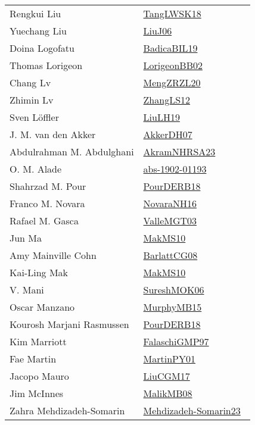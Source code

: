 {\begin{longtable}{p{4cm}p{20cm}}
Rengkui Liu & \href{}{TangLWSK18}~\cite{TangLWSK18}\\
Yuechang Liu & \href{works/LiuJ06.pdf}{LiuJ06}~\cite{LiuJ06}\\
Doina Logofatu & \href{works/BadicaBIL19.pdf}{BadicaBIL19}~\cite{BadicaBIL19}\\
Thomas Lorigeon & \href{}{LorigeonBB02}~\cite{LorigeonBB02}\\
Chang Lv & \href{works/MengZRZL20.pdf}{MengZRZL20}~\cite{MengZRZL20}\\
Zhimin Lv & \href{works/ZhangLS12.pdf}{ZhangLS12}~\cite{ZhangLS12}\\
Sven L{\"{o}}ffler & \href{works/LiuLH19.pdf}{LiuLH19}~\cite{LiuLH19}\\
J. M. van den Akker & \href{works/AkkerDH07.pdf}{AkkerDH07}~\cite{AkkerDH07}\\
Abdulrahman M. Abdulghani & \href{works/AkramNHRSA23.pdf}{AkramNHRSA23}~\cite{AkramNHRSA23}\\
O. M. Alade & \href{works/abs-1902-01193.pdf}{abs-1902-01193}~\cite{abs-1902-01193}\\
Shahrzad M. Pour & \href{works/PourDERB18.pdf}{PourDERB18}~\cite{PourDERB18}\\
Franco M. Novara & \href{works/NovaraNH16.pdf}{NovaraNH16}~\cite{NovaraNH16}\\
Rafael M. Gasca & \href{works/ValleMGT03.pdf}{ValleMGT03}~\cite{ValleMGT03}\\
Jun Ma & \href{works/MakMS10.pdf}{MakMS10}~\cite{MakMS10}\\
Amy Mainville Cohn & \href{works/BarlattCG08.pdf}{BarlattCG08}~\cite{BarlattCG08}\\
Kai{-}Ling Mak & \href{works/MakMS10.pdf}{MakMS10}~\cite{MakMS10}\\
V. Mani & \href{}{SureshMOK06}~\cite{SureshMOK06}\\
Oscar Manzano & \href{works/MurphyMB15.pdf}{MurphyMB15}~\cite{MurphyMB15}\\
Kourosh Marjani Rasmussen & \href{works/PourDERB18.pdf}{PourDERB18}~\cite{PourDERB18}\\
Kim Marriott & \href{works/FalaschiGMP97.pdf}{FalaschiGMP97}~\cite{FalaschiGMP97}\\
Fae Martin & \href{works/MartinPY01.pdf}{MartinPY01}~\cite{MartinPY01}\\
Jacopo Mauro & \href{works/LiuCGM17.pdf}{LiuCGM17}~\cite{LiuCGM17}\\
Jim McInnes & \href{}{MalikMB08}~\cite{MalikMB08}\\
Zahra Mehdizadeh{-}Somarin & \href{works/Mehdizadeh-Somarin23.pdf}{Mehdizadeh-Somarin23}~\cite{Mehdizadeh-Somarin23}\\

\end{longtable}}
